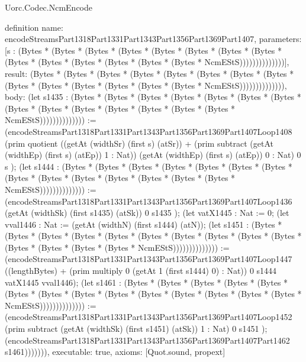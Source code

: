 \begin{lexlean}{Uorc.Codec.NcmEncode}
\begin{semanticmodule}
definition{
  name: encodeStreamsPart1318Part1331Part1343Part1356Part1369Part1407,
  parameters: [s : (Bytes * (Bytes * (Bytes * (Bytes * (Bytes * (Bytes * (Bytes * (Bytes * (Bytes * (Bytes * (Bytes * (Bytes * (Bytes * (Bytes * NcmEStS))))))))))))))],
  result: (Bytes * (Bytes * (Bytes * (Bytes * (Bytes * (Bytes * (Bytes * (Bytes * (Bytes * (Bytes * (Bytes * (Bytes * (Bytes * (Bytes * NcmEStS)))))))))))))),
  body: (let s1435 : (Bytes * (Bytes * (Bytes * (Bytes * (Bytes * (Bytes * (Bytes * (Bytes * (Bytes * (Bytes * (Bytes * (Bytes * (Bytes * (Bytes * NcmEStS)))))))))))))) := (encodeStreamsPart1318Part1331Part1343Part1356Part1369Part1407Loop1408 (prim quotient ((getAt (widthSr) (first s) (atSr)) + (prim subtract (getAt (widthEp) (first s) (atEp)) 1 : Nat)) (getAt (widthEp) (first s) (atEp)) 0 : Nat) 0 s ); (let s1444 : (Bytes * (Bytes * (Bytes * (Bytes * (Bytes * (Bytes * (Bytes * (Bytes * (Bytes * (Bytes * (Bytes * (Bytes * (Bytes * (Bytes * NcmEStS)))))))))))))) := (encodeStreamsPart1318Part1331Part1343Part1356Part1369Part1407Loop1436 (getAt (widthSk) (first s1435) (atSk)) 0 s1435 ); (let vatX1445 : Nat := 0; (let vval1446 : Nat := (getAt (widthN) (first s1444) (atN)); (let s1451 : (Bytes * (Bytes * (Bytes * (Bytes * (Bytes * (Bytes * (Bytes * (Bytes * (Bytes * (Bytes * (Bytes * (Bytes * (Bytes * (Bytes * NcmEStS)))))))))))))) := (encodeStreamsPart1318Part1331Part1343Part1356Part1369Part1407Loop1447 ((lengthBytes) + (prim multiply 0 (getAt 1 (first s1444) 0) : Nat)) 0 s1444 vatX1445 vval1446); (let s1461 : (Bytes * (Bytes * (Bytes * (Bytes * (Bytes * (Bytes * (Bytes * (Bytes * (Bytes * (Bytes * (Bytes * (Bytes * (Bytes * (Bytes * NcmEStS)))))))))))))) := (encodeStreamsPart1318Part1331Part1343Part1356Part1369Part1407Loop1452 (prim subtract (getAt (widthSk) (first s1451) (atSk)) 1 : Nat) 0 s1451 ); (encodeStreamsPart1318Part1331Part1343Part1356Part1369Part1407Part1462 s1461))))))),
  executable: true,
  axioms: [Quot.sound, propext]
}


\end{semanticmodule}
\end{lexlean}
